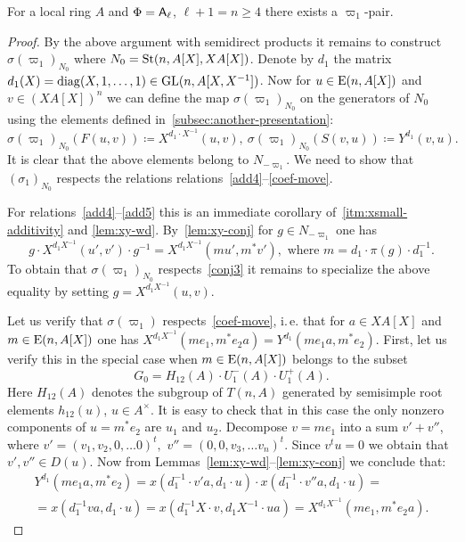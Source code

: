 \begin{prop} \label{prop:sigma-construction}
    For a local ring $A$ and $\Phi = \mathsf{A}_\ell$, $\ell + 1 = n \geq 4$ there exists a $\varpi_1$-pair.
\end{prop}
\begin{proof}
    By the above argument with semidirect products it remains to construct $\sigma(\varpi_1)_{N_0}$ where $N_0 = \operatorname{St}(n, A[X], XA[X])$.
    Denote by $d_1$ the matrix $d_1(X) = \mathrm{diag}(X, 1, \ldots, 1) \in \operatorname{GL}(n, A[X, X^{-1}])$.
    Now for $u \in \operatorname{E}(n, A[X])$ and $v \in (XA[X])^n$ we can define the map $\sigma(\varpi_1)_{N_0}$ on the generators of $N_{0}$
    using the elements defined in~\cref{subsec:another-presentation}:
    \begin{equation*}
    \sigma(\varpi_1)_{N_0} (F(u, v)) \coloneqq X^{d_1 \cdot X^{-1}}(u, v),\ \sigma(\varpi_1)_{N_0} (S(v, u)) \coloneqq Y^{d_1}(v, u).
    \end{equation*}
    It is clear that the above elements belong to $N_{-\varpi_1}$.
    We need to show that $(\sigma_1)_{N_0}$ respects the relations relations~\eqref{add4}--\eqref{coef-move}.

    For relations~\eqref{add4}--\eqref{add5} this is an immediate corollary of~\cref{itm:xsmall-additivity} and \cref{lem:xy-wd}.
    By~\cref{lem:xy-conj} for $g \in N_{-\varpi_1}$ one has
    \begin{equation}
        \label{eq:xy-conj-n1}
        g \cdot X^{d_1 X^{-1}}(u', v') \cdot g^{-1} = X^{d_1 X^{-1}}(mu', m^*v'), \text{ where } m = d_1 \cdot \pi(g) \cdot d_1^{-1}.
    \end{equation}
    To obtain that $\sigma(\varpi_1)_{N_0}$ respects~\eqref{conj3} it remains to specialize the above equality by setting $g = X^{d_1 X^{-1}}(u, v)$.

    Let us verify that $\sigma(\varpi_1)$ respects~\eqref{coef-move}, i.\,e. that for $a\in XA[X]$ and $m \in \operatorname{E}(n, A[X])$ one has
    $X^{d_1 X^{-1}}(me_1, m^*e_2 a) = Y^{d_1}(me_1 a, m^* e_2)$.
    First, let us verify this in the special case when $m \in \operatorname{E}(n, A[X])$ belongs to the subset
    \[G_0 = H_{12}(A) \cdot U^-_1(A) \cdot U^+_1(A).\]
    Here $H_{12}(A)$ denotes the subgroup of $T(n, A)$ generated by semisimple root elements $h_{12}(u)$, $u \in A^\times$.
    It is easy to check that in this case the only nonzero components of $u = m^* e_2$ are $u_1$ and $u_2$.
    Decompose $v = m e_1$ into a sum $v' + v''$, where $v' = (v_1, v_2, 0, \ldots 0)^t,$ $v'' = (0, 0, v_3, \ldots v_n)^t$.
    Since $v^t u = 0$ we obtain that $v', v'' \in D(u)$.
    Now from Lemmas~\ref{lem:xy-wd}--\ref{lem:xy-conj} we conclude that:
    \begin{multline}
        \label{eq:special-case}
        Y^{d_1}(me_{1}a, m^* e_2) = x(d_1^{-1} \cdot v'a, d_1\cdot  u) \cdot x(d_1^{-1}\cdot v''a, d_1 \cdot u) = \\
        = x(d_1^{-1} va, d_1 \cdot u) = x(d_1^{-1}X \cdot v, d_{1}X^{-1} \cdot u a) = X^{d_1 X^{-1}}(me_1, m^*e_2 a).
    \end{multline}


\end{proof}
